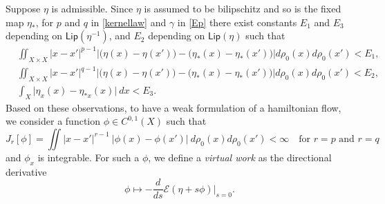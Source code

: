 \documentclass[10pt, letterpaper]{article}
\def\E{{\mathcal{E}}}
\def\Lip{{\textsf{Lip}}}
\def\drr{{d\rho_0(x)d\rho_0(x')}}
\theoremstyle{definition}
\theoremstyle{remark}
\begin{document}
Suppose $\eta$ is admissible. Since $\eta$ is assumed to be bilipschitz and so is the fixed map $\eta_*$, for $p$ and $q$ in \eqref{kernellaw} and $\gamma$ in \eqref{Ep}
there exist constants $E_1$ and $E_3$ depending on $\Lip(\eta^{-1})$, and $E_2$ depending on $\Lip(\eta)$ such that 
\begin{equation} \label{suff}
\begin{align*}
 &\iint_{X \times X} |x-x'|^{p-1}\Big| \big(\eta(x)-\eta(x')\big) -\big(\eta_*(x)-\eta_*(x')\big)\Big| d\rho_0(x)d\rho_0(x') < E_1,\\
 &\iint_{X \times X} |x-x'|^{q-1}\Big| \big(\eta(x)-\eta(x')\big) -\big(\eta_*(x)-\eta_*(x')\big)\Big| d\rho_0(x)d\rho_0(x') < E_2,\\
&\int_X \Big|\eta_x(x) - \eta_{*x}(x)\Big| \: dx < E_3.
\end{align*}
\end{equation}
Based on these observations, to have a weak formulation of a hamiltonian flow, we consider a function $\phi\in C^{0,1}(X)$ such that %
\begin{equation}
 J_r[\phi]=\iint |x-x'|^{r-1}~| \phi(x) - \phi(x')| \:d\rho_0(x)d\rho_0(x') < \infty \quad \text{for $r=p$ and $r=q$} \label{phicond}
\end{equation}
and $\phi_x$ is integrable.
For such a $\phi$, we define a {\it virtual work} as the directional derivative
$$ \phi \mapsto -\frac{d}{ds} \E(\eta + s\phi) \Big|_{s=0}.$$
\end{document}
